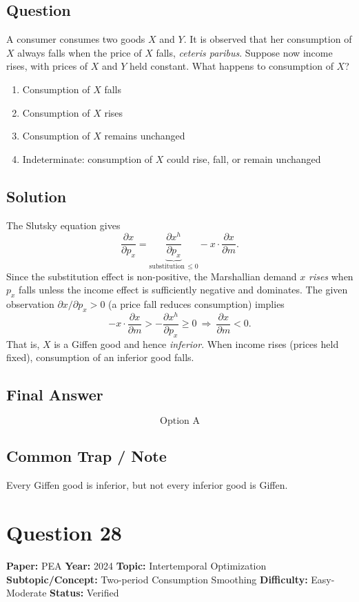 \documentclass[11pt]{article}
\begin{document}
\subsection*{Question}
A consumer consumes two goods $X$ and $Y$. It is observed that her consumption of $X$ always falls when the price of $X$ falls, \emph{ceteris paribus}. Suppose now income rises, with prices of $X$ and $Y$ held constant. What happens to consumption of $X$?
\begin{enumerate}[label=(\Alph*)]
\item Consumption of $X$ falls
\item Consumption of $X$ rises
\item Consumption of $X$ remains unchanged
\item Indeterminate: consumption of $X$ could rise, fall, or remain unchanged
\end{enumerate}

\subsection*{Solution}
The Slutsky equation gives
\[
\frac{\partial x}{\partial p_x}= \underbrace{\frac{\partial x^{h}}{\partial p_x}}_{\text{substitution}\,\le 0}- x\cdot\frac{\partial x}{\partial m}.
\]
Since the substitution effect is non-positive, the Marshallian demand $x$ \emph{rises} when $p_x$ falls unless the income effect is sufficiently negative and dominates. The given observation $\partial x/\partial p_x>0$ (a price fall reduces consumption) implies
\[
-x\cdot\frac{\partial x}{\partial m}>-\frac{\partial x^{h}}{\partial p_x}\ge 0\ \Longrightarrow\ \frac{\partial x}{\partial m}<0.
\]
That is, $X$ is a Giffen good and hence \emph{inferior}. When income rises (prices held fixed), consumption of an inferior good falls.

\subsection*{Final Answer}
\[
\boxed{\text{Option A}}
\]

\subsection*{Common Trap / Note}
Every Giffen good is inferior, but not every inferior good is Giffen.

\section*{Question 28}
\textbf{Paper:} PEA \quad \textbf{Year:} 2024 \quad \textbf{Topic:} Intertemporal Optimization \\
\textbf{Subtopic/Concept:} Two-period Consumption Smoothing \quad \textbf{Difficulty:} Easy-Moderate \quad \textbf{Status:} Verified
\end{document}
